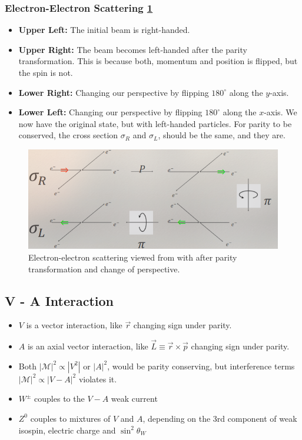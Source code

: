 \subsubsection{Electron-Electron Scattering \cref{fig: electron_electron_parity}}
\begin{itemize}
  \item \textbf{Upper Left:} The initial beam is right-handed. 
  \item \textbf{Upper Right:} The beam becomes left-handed after the parity transformation. This is because both, momentum and position is flipped, but the spin is not.
  \item \textbf{Lower Right:} Changing our perspective by flipping $180^∘$ along the $y$-axis. 
  \item \textbf{Lower Left:} Changing our perspective by flipping $180^∘$ along the $x$-axis. We now have the original state, but with left-handed particles. For parity to be conserved, the cross section $σ_{R}$ and $σ_{L}$, should be the same, and they are. 
\end{itemize}
\begin{figure}[ht!]
\centering
\includegraphics[width = \textwidth]{electron_electron_parity.png}
\caption{Electron-electron scattering viewed from with after parity transformation and change of perspective.}
\label{fig: electron_electron_parity}
\end{figure}

\subsection{V - A Interaction}
\begin{itemize}
  \item $V$ is a vector interaction, like $\vec{r}$ changing sign under parity.
  \item $A$ is an axial vector interaction, like $\vec{L} ≡ \vec{r} × \vec{p}$ changing sign under parity.
  \item Both $\left|\mathcal{M}\right|^2 \propto \left|V^2\right|$ or $\left|A\right|^2$, would be parity conserving, but interference terms $\left|\mathcal{M}\right|^2 \propto \left|V - A\right|^2$ violates it. 
  \item $W^{±}$ couples to the $V-A$ weak current 
  \item $Z^{0}$ couples to mixtures of $V$ and $A$, depending on the 3rd component of weak isospin, electric charge and $\sin^2 θ_{W}$
\end{itemize}

